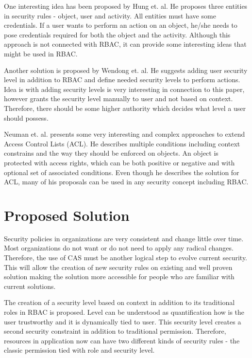 \documentclass{sig-alternate}
\begin{document}
One interesting idea has been proposed by Hung et. al. \cite{hung} He proposes three entities in security rules - object, user and activity. All entities must have some credentials. If a user wants to perform an action on an object, he/she needs to pose credentials required for both the object and the activity. Although this approach is not connected with RBAC, it can provide some interesting ideas that might be used in RBAC.

Another solution is proposed by Wendong et. al. \cite{wendong} He suggests adding user security level in addition to RBAC and define needed security levels to perform actions. Idea is with adding security levels is very interesting in connection to this paper, however grants the security level manually to user and not based on context. Therefore, there should be some higher authority which decides what level a user should possess.

Neuman et. al. \cite{eacl} presents some very interesting and complex approaches to extend Access Control Lists (ACL). He describes multiple conditions including context constrains and the way they should be enforced on objects. An object is protected with access rights, which can be both positive or negative and with optional set of associated conditions. Even though he describes the solution for ACL, many of his proposals can be used in any security concept including RBAC.

\section{Proposed Solution}
Security policies in organizations are very consistent and change little over time. Most organizations do not want or do not need to apply any radical changes. Therefore, the use of CAS must be another logical step to evolve current security. This will allow the creation of new security rules on existing and well proven solution making the solution more accessible for people who are familiar with current solutions.

The creation of a security level based on context in addition to its traditional roles in RBAC is proposed. Level can be understood as quantification how is the user trustworthy and it is dynamically tied to user. This security level creates a second security constraint in addition to traditional permission.  Therefore, resources in application now can have two different kinds of security rules - the classic permission tied with role and security level.
\end{document}
